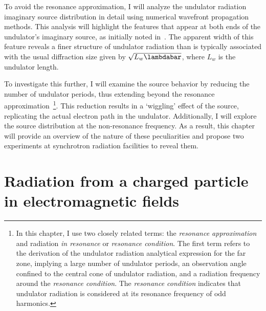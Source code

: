     To avoid the resonance approximation, I will analyze the undulator radiation imaginary source distribution in detail using numerical wavefront propagation methods. This analysis will highlight the features that appear at both ends of the undulator’s imaginary source, as initially noted in~\cite{geloni_fourier_2007}. The apparent width of this feature reveals a finer structure of undulator radiation than is typically associated with the usual diffraction size given by $\sqrt{L_w \lambdabar}$, where $L_w$ is the undulator length.
    
    To investigate this further, I will examine the source behavior by reducing the number of undulator periods, thus extending beyond the resonance approximation~\footnote{In this chapter, I use two closely related terms: the \textit{resonance approximation} and radiation \textit{in resonance} or \textit{resonance condition}. The first term refers to the derivation of the undulator radiation analytical expression for the far zone, implying a large number of undulator periods, an observation angle confined to the central cone of undulator radiation, and a radiation frequency around the \textit{resonance condition}. The \textit{resonance condition} indicates that undulator radiation is considered at its resonance frequency of odd harmonics.}. This reduction results in a ‘wiggling’ effect of the source, replicating the actual electron path in the undulator. Additionally, I will explore the source distribution at the non-resonance frequency. As a result, this chapter will provide an overview of the nature of these peculiarities and propose two experiments at synchrotron radiation facilities to reveal them.
    
\section{Radiation from a charged particle in electromagnetic fields}

